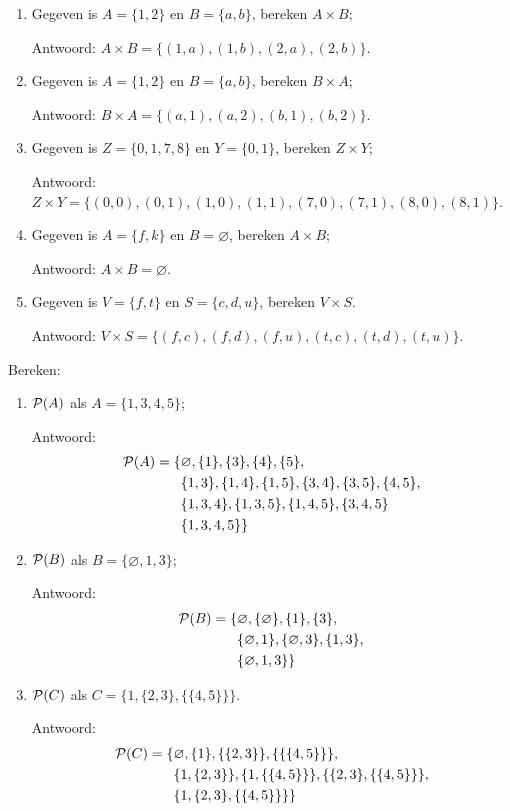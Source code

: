 \begin{answer}\mbox{} %
\begin{enumerate}[label=\textit{\alph*.}]
\item Gegeven is $A=\{1,2\}$ en $B=\{a,b\}$, bereken $A\times B$;

 Antwoord: $A\times B= \{(1,a), (1,b), (2,a), (2,b)\}$.
\item Gegeven is $A=\{1,2\}$ en $B=\{a,b\}$, bereken $B\times A$;

 Antwoord: $B\times A=\{(a, 1), (a,2), (b,1), (b,2)\}$.
\item Gegeven is $Z=\{0,1,7,8\}$ en $Y=\{0,1\}$, bereken $Z\times Y$;

 Antwoord: $Z\times Y=\{(0,0), (0,1), (1,0), (1,1), (7,0), (7,1), (8,0), (8,1)\}$.
\item Gegeven is $A=\{f,k\}$ en $B=\varnothing$, bereken $A\times B$;

 Antwoord: $A\times B=\varnothing$.
\item Gegeven is $V=\{f,t\}$ en $S=\{c,d,u\}$, bereken $V\times S$.

\noindent Antwoord: $V\times S=\{(f,c), (f,d), (f,u), (t,c), (t,d), (t,u)\}$.
\end{enumerate}
\end{answer}

\begin{answer} %
Bereken:
\begin{enumerate}[label=\textit{\alph*.}]
\item $\mathcal{P}(A)$ als $A = \{1,3,4,5\}$;

 Antwoord: 
\begin{align*}
\mathcal{P}(A)=\{&\varnothing, \{1\},\{3\},\{4\},\{5\},\\
&\{1,3\},\{1,4\}, \{1,5\}, \{3,4\}, \{3,5\}, \{4,5\},\\
&\{1,3,4\}, \{1,3,5\}, \{1,4,5\}, \{3,4,5\}\\
&\{1,3,4,5\}\}
\end{align*}
\item $\mathcal{P}(B)$ als $B=\{\varnothing, 1,3\}$;

 Antwoord:
\begin{align*}
\mathcal{P}(B)=\{&\varnothing, \{\varnothing\}, \{1\}, \{3\},\\
&\{\varnothing, 1\}, \{\varnothing, 3\}, \{1,3\},\\
&\{\varnothing, 1, 3\}\}
\end{align*}
\item $\mathcal{P}(C)$ als $C=\{1,\{2,3\},\{\{4,5\}\}\}$.

 Antwoord:
\begin{align*}
\mathcal{P}(C)=\{&\varnothing, \{1\}, \{\{2,3\}\}, \{\{\{4,5\}\}\},\\
&\{1,\{2,3\}\}, \{1,\{\{4,5\}\}\}, \{\{2,3\},\{\{4,5\}\}\},\\
&\{1,\{2,3\},\{\{4,5\}\}\}\}
\end{align*}
\end{enumerate}
\end{answer}

